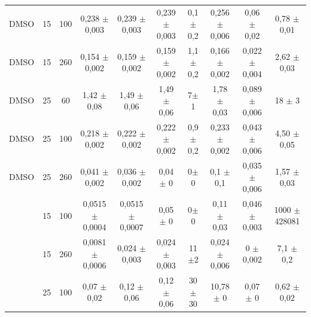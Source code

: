 \begin{table}[h]
\begin{adjustbox}{angle=90}
{\begin{tabular}{c c c | c c c c c c c}
				DMSO    & 15         & 100      & 0,238   \(\pm\) 0,003  & 0,239    \(\pm\) 0,003  & 0,239     \(\pm\) 0,003   & 0,1\(\pm\)0,2 & 0,256       \(\pm\) 0,006  & 0,06        \(\pm\) 0,02     & 0,78  \(\pm\)  0,01  \\
				DMSO    & 15         & 260      & 0,154   \(\pm\) 0,002  & 0,159    \(\pm\) 0,002  & 0,159     \(\pm\) 0,002   & 1,1\(\pm\)0,2 & 0,166       \(\pm\) 0,002  & 0,022       \(\pm\) 0,004    & 2,62  \(\pm\)  0,03  \\
				DMSO    & 25         & 60       & 1,42    \(\pm\) 0,08   & 1,49     \(\pm\) 0,06   & 1,49      \(\pm\) 0,06    & 7\(\pm\)1     & 1,78        \(\pm\) 0,03   & 0,089       \(\pm\) 0,006    & 18    \(\pm\)      3  \\
				DMSO    & 25         & 100      & 0,218   \(\pm\) 0,002  & 0,222    \(\pm\) 0,002  & 0,222     \(\pm\) 0,002   & 0,9\(\pm\)0,2 & 0,233       \(\pm\) 0,002  & 0,043       \(\pm\) 0,006    & 4,50  \(\pm\)  0,05  \\
				DMSO    & 25         & 260      & 0,041   \(\pm\) 0,002  & 0,036    \(\pm\) 0,002  & 0,04      \(\pm\) 0       & 0\(\pm\)0     & 0,1         \(\pm\) 0,1    & 0,035       \(\pm\) 0,006    & 1,57  \(\pm\)  0,03  \\
				\BD{}    & 15         & 100      & 0,0515  \(\pm\) 0,0004 & 0,0515   \(\pm\) 0,0007 & 0,05      \(\pm\) 0       & 0\(\pm\)0     & 0,11        \(\pm\) 0,03   & 0,046       \(\pm\) 0,003    & 1000  \(\pm\)  428081  \\
				\BD{}    & 15         & 260      & 0,0081  \(\pm\) 0,0006 & 0,024    \(\pm\) 0,003  & 0,024     \(\pm\) 0,003   & 11\(\pm\)2    & 0,024       \(\pm\) 0,006  & 0           \(\pm\) 0,002    & 7,1   \(\pm\)   0,2  \\
				\BD{}    & 25         & 100      & 0,07    \(\pm\) 0,02   & 0,12     \(\pm\) 0,06   & 0,12      \(\pm\) 0,06   & 30\(\pm\)30   & 10,78       \(\pm\) 0      & 0,07        \(\pm\) 0         & 0,62  \(\pm\)  0,02  \\ \bottomrule
			\end{tabular} 
			
		}{} \end{adjustbox}
\end{table} 

